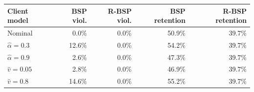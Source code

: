 \begin{tabular}{lrrrr}
\toprule
Client model & BSP viol. & R-BSP viol. & BSP retention & R-BSP retention \\
\midrule
Nominal & 0.0\% & 0.0\% & 50.9\% & 39.7\% \\
$\widehat{\alpha}=0.3$ & 12.6\% & 0.0\% & 54.2\% & 39.7\% \\
$\widehat{\alpha}=0.9$ & 2.6\% & 0.0\% & 47.3\% & 39.7\% \\
$\widehat{v}=0.05$ & 2.8\% & 0.0\% & 46.9\% & 39.7\% \\
$\widehat{v}=0.8$ & 14.6\% & 0.0\% & 55.2\% & 39.7\% \\
\bottomrule
\end{tabular}
